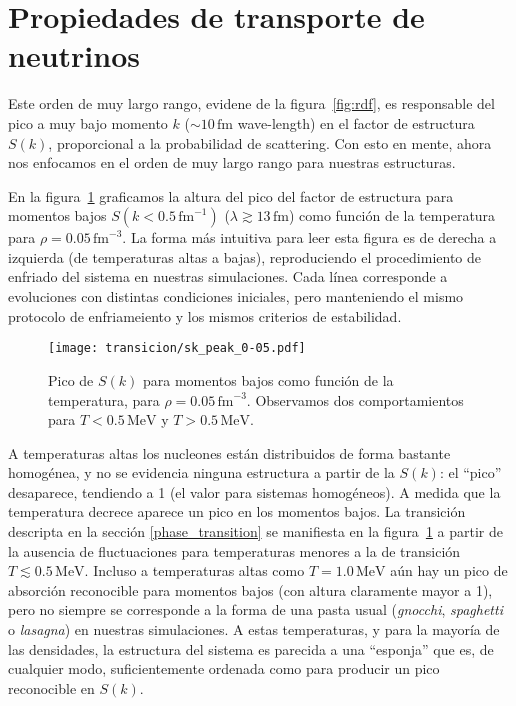 \section{Propiedades de transporte de neutrinos}
Este orden de muy largo rango, evidene de la figura~\ref{fig:rdf}, es responsable del pico a muy bajo momento $k$ ($\sim 10\,\text{fm}$ wave-length) en el factor de estructura $S(k)$, proporcional a la probabilidad de scattering.
Con esto en mente, ahora nos enfocamos en el orden de muy largo rango para nuestras estructuras.

En la figura~\ref{fig:sk_peak_0-05} graficamos la altura del pico del factor de estructura para momentos bajos $S(k<0.5\,\text{fm}^{-1})$ ($\lambda\gtrsim13\,\text{fm}$) como función de la temperatura para $\rho=0.05\,\text{fm}^{-3}$.
La forma más intuitiva para leer esta figura es de derecha a izquierda (de temperaturas altas a bajas), reproduciendo el procedimiento de enfriado del sistema en nuestras simulaciones.
Cada línea corresponde a evoluciones con distintas condiciones iniciales, pero manteniendo el mismo protocolo de enfriameiento y los mismos criterios de estabilidad.

\begin{figure}
  \texttt{[image: transicion/sk\_peak\_0-05.pdf]}
  \caption{Pico de $S(k)$ para momentos bajos como función de la temperatura, para $\rho=0.05\,\text{fm}^{-3}$.
    Observamos dos comportamientos para $T<0.5\,\text{MeV}$ y $T>0.5\,\text{MeV}$.  }
  \label{fig:sk_peak_0-05}
\end{figure}

A temperaturas altas los nucleones están distribuidos de forma bastante homogénea, y no se evidencia ninguna estructura a partir de la $S(k)$: el ``pico'' desaparece, tendiendo a 1 (el valor para sistemas homogéneos).
A medida que la temperatura decrece aparece un pico en los momentos bajos.
La transición descripta en la sección \ref{phase_transition} se manifiesta en la figura~\ref{fig:sk_peak_0-05} a partir de la ausencia de fluctuaciones para temperaturas menores a la de transición $T \lesssim 0.5\,\text{MeV}$.
Incluso a temperaturas altas como
$T=1.0\,\text{MeV}$ aún hay un pico de absorción reconocible para momentos bajos (con altura claramente mayor a 1), pero no siempre se corresponde a la forma de una pasta usual (\emph{gnocchi}, \emph{spaghetti} o
\emph{lasagna}) en nuestras simulaciones.
A estas temperaturas, y para la mayoría de las densidades, la estructura del sistema es parecida a una ``esponja'' que es, de cualquier modo, suficientemente ordenada como para producir un pico reconocible en $S(k)$.

